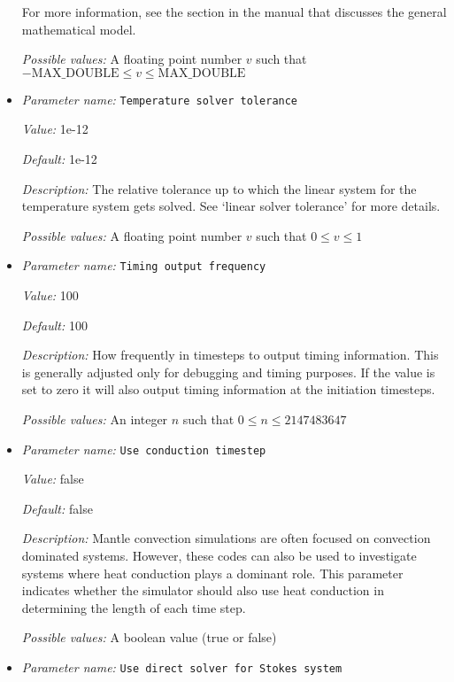 \begin{itemize}
For more information, see the section in the manual that discusses the general mathematical model.


{\it Possible values:} A floating point number $v$ such that $-\text{MAX\_DOUBLE} \leq v \leq \text{MAX\_DOUBLE}$
\item {\it Parameter name:} {\tt Temperature solver tolerance}
\label{parameters:Temperature solver tolerance}


{\it Value:} 1e-12


{\it Default:} 1e-12


{\it Description:} The relative tolerance up to which the linear system for the temperature system gets solved. See `linear solver tolerance' for more details.


{\it Possible values:} A floating point number $v$ such that $0 \leq v \leq 1$
\item {\it Parameter name:} {\tt Timing output frequency}
\label{parameters:Timing output frequency}


{\it Value:} 100


{\it Default:} 100


{\it Description:} How frequently in timesteps to output timing information. This is generally adjusted only for debugging and timing purposes. If the value is set to zero it will also output timing information at the initiation timesteps.


{\it Possible values:} An integer $n$ such that $0\leq n \leq 2147483647$
\item {\it Parameter name:} {\tt Use conduction timestep}
\label{parameters:Use conduction timestep}


{\it Value:} false


{\it Default:} false


{\it Description:} Mantle convection simulations are often focused on convection dominated systems. However, these codes can also be used to investigate systems where heat conduction plays a dominant role. This parameter indicates whether the simulator should also use heat conduction in determining the length of each time step.


{\it Possible values:} A boolean value (true or false)
\item {\it Parameter name:} {\tt Use direct solver for Stokes system}
\label{parameters:Use direct solver for Stokes system}



\end{itemize}
